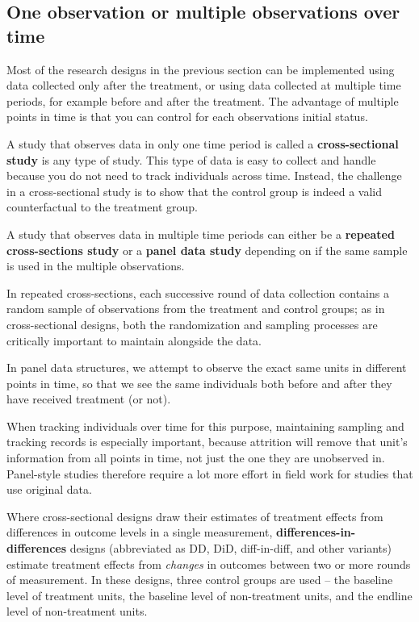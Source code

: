 

\subsection{One observation or multiple observations over time}

Most of the research designs in the previous section can be implemented 
using data collected only after the treatment, 
or using data collected at multiple time periods, 
for example before and after the treatment. 
The advantage of multiple points in time is 
that you can control for each observations initial status.

A study that observes data in only one time period is called 
a \textbf{cross-sectional study} is any type of study. 
This type of data is easy to collect and handle because
you do not need to track individuals across time. 
Instead, the challenge in a cross-sectional study is to
show that the control group is indeed a valid counterfactual to the treatment group.

A study that observes data in multiple time periods can either be a 
\textbf{repeated cross-sections study} or a \textbf{panel data study} 
depending on if the same sample is used in the multiple observations.

In repeated cross-sections, each successive round of data collection contains a random sample
of observations from the treatment and control groups;
as in cross-sectional designs, both the randomization and sampling processes
are critically important to maintain alongside the data.

In panel data structures, we attempt to observe the exact same units
in different points in time, so that we see the same individuals
both before and after they have received treatment (or not).

When tracking individuals over time for this purpose,
maintaining sampling and tracking records is especially important,
because attrition will remove that unit's information
from all points in time, not just the one they are unobserved in.
Panel-style studies therefore require a lot more effort in field work
for studies that use original data.

Where cross-sectional designs draw their estimates of treatment effects
from differences in outcome levels in a single measurement,
\textbf{differences-in-differences}
designs (abbreviated as DD, DiD, diff-in-diff, and other variants)
estimate treatment effects from \textit{changes} in outcomes
between two or more rounds of measurement.
In these designs, three control groups are used –
the baseline level of treatment units,
the baseline level of non-treatment units,
and the endline level of non-treatment units.

